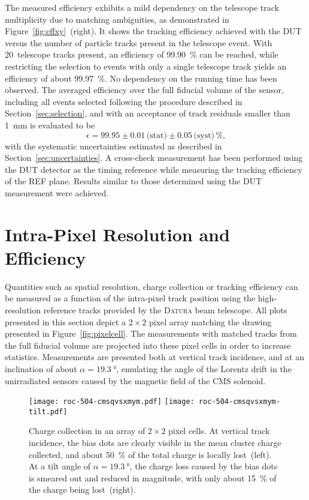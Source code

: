 \documentclass[a4paper,11pt]{article}
\newcommand{\SIERR}[4]{\ensuremath{\num{#1}\pm\num{#2}\,\text{(stat)}\pm\num{#3}\,\text{(syst)}\,\si{#4}}}
\newcommand{\datura}{\textsc{Datura}\xspace}
\begin{document}
The measured efficiency exhibits a mild dependency on the telescope track multiplicity due to matching ambiguities, as demonstrated in Figure~\ref{fig:effxy}~(right).
It shows the tracking efficiency achieved with the DUT versus the number of particle tracks present in the telescope event.
With 20~telescope tracks present, an efficiency of \SI{99.90}{\percent} can be reached, while restricting the selection to events with only a single telescope track yields an efficiency of about \SI{99.97}{\percent}.
No dependency on the running time has been observed.
The averaged efficiency over the full fiducial volume of the sensor, including all events selected following the procedure described in Section~\ref{sec:selection}, and with an acceptance of track residuals smaller than \SI{1}{\mm} is evaluated to be
\begin{equation*}
  \epsilon = \SIERR{99.95}{0.01}{0.05}{\percent}\text{,}
\end{equation*}
with the systematic uncertainties estimated as described in Section~\ref{sec:uncertainties}.
A cross-check measurement has been performed using the DUT detector as the timing reference while measuring the tracking efficiency of the REF plane.
Results similar to those determined using the DUT measurement were achieved.


\section{Intra-Pixel Resolution and Efficiency}
\label{sec:intrapixel}

Quantities such as spatial resolution, charge collection or tracking efficiency can be measured as a function of the intra-pixel track position using the high-resolution reference tracks provided by the \datura beam telescope.
All plots presented in this section depict a $2\times2$ pixel array matching the drawing presented in Figure~\ref{fig:pixelcell}.
The measurements with matched tracks from the full fiducial volume are projected into these pixel cells in order to increase statistics.
Measurements are presented both at vertical track incidence, and at an inclination of about $\alpha = \SI{19.3}{\degree}$, emulating the angle of the Lorentz drift in the unirradiated sensors caused by the magnetic field of the CMS solenoid.

\begin{figure}[tbp]
  \centering
  \texttt{[image: roc-504-cmsqvsxmym.pdf]}%
  \texttt{[image: roc-504-cmsqvsxmym-tilt.pdf]}
  \caption[Charge collection in a $2\times2$ pixel array]{Charge collection in an array of $2\times2$ pixel cells. At vertical track incidence, the bias dots are clearly visible in the mean cluster charge collected, and about \SI{50}{\percent} of the total charge is locally lost~(left). At a tilt angle of $\alpha = \SI{19.3}{\degree}$, the charge loss caused by the bias dots is smeared out and reduced in magnitude, with only about \SI{15}{\percent} of the charge being lost~(right).}
  \label{fig:cce}
\end{figure}
\end{document}
